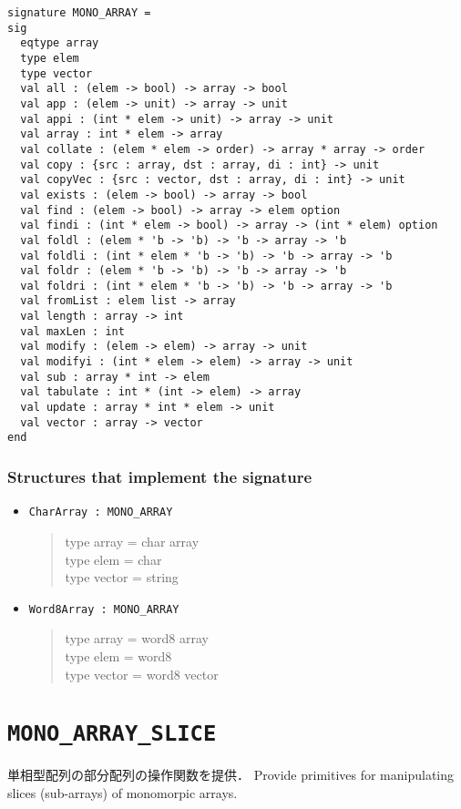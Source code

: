 \documentclass{jbook}
\newcommand{\txt}[2]{#2}
\newcommand{\code}[1]{\mbox{\large\tt #1}}
\newenvironment{program}{\begin{quote}\begin{tt}}%
                        {\end{tt}\end{quote}}
\newcommand{\signature}[2]{
\section{{\tt #1}}\label{section:reference:#2}
}
\newcommand{\Structure}{\subsubsection*{\txt{シグネチャを実装するストラクチャ}{Structures that implement the signature}}}
\begin{document}
\begin{verbatim}
signature MONO_ARRAY =
sig
  eqtype array
  type elem
  type vector
  val all : (elem -> bool) -> array -> bool
  val app : (elem -> unit) -> array -> unit
  val appi : (int * elem -> unit) -> array -> unit
  val array : int * elem -> array
  val collate : (elem * elem -> order) -> array * array -> order
  val copy : {src : array, dst : array, di : int} -> unit
  val copyVec : {src : vector, dst : array, di : int} -> unit
  val exists : (elem -> bool) -> array -> bool
  val find : (elem -> bool) -> array -> elem option
  val findi : (int * elem -> bool) -> array -> (int * elem) option
  val foldl : (elem * 'b -> 'b) -> 'b -> array -> 'b
  val foldli : (int * elem * 'b -> 'b) -> 'b -> array -> 'b
  val foldr : (elem * 'b -> 'b) -> 'b -> array -> 'b
  val foldri : (int * elem * 'b -> 'b) -> 'b -> array -> 'b
  val fromList : elem list -> array
  val length : array -> int
  val maxLen : int
  val modify : (elem -> elem) -> array -> unit
  val modifyi : (int * elem -> elem) -> array -> unit
  val sub : array * int -> elem
  val tabulate : int * (int -> elem) -> array
  val update : array * int * elem -> unit
  val vector : array -> vector
end
\end{verbatim}

\Structure
\begin{itemize}
\item \code{CharArray : MONO\_ARRAY}
\begin{program}
   type array = char array
\\
   type elem = char
\\
   type vector = string
\end{program}
\item \code{Word8Array : MONO\_ARRAY}
\begin{program}
   type array = word8 array
\\
   type elem = word8
\\
   type vector = word8 vector
\end{program}
\end{itemize}

\signature{MONO\_ARRAY\_SLICE}{MONOARRAYSLICE}
\ifjp%
	単相型配列の部分配列の操作関数を提供．
\else%
	Provide primitives for manipulating slices (sub-arrays) of
monomorpic arrays.
\fi%
\end{document}
